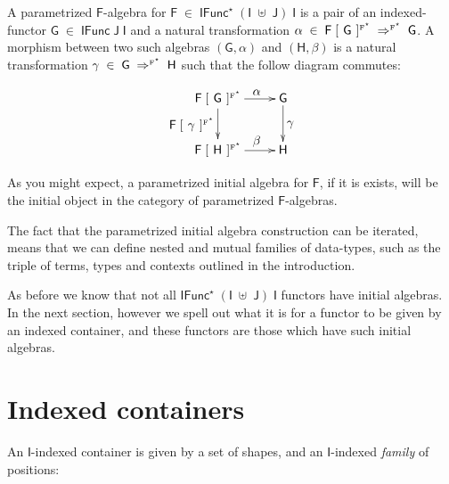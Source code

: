 \documentclass[a4paper]{article}
\newcommand{\Conid}[1]{\mathit{#1}}
\newcommand{\Varid}[1]{\mathit{#1}}
\renewcommand\Varid[1]{\mathord{\textsf{#1}}}
\let\Conid\Varid
\begin{document}
\noindent
A parametrized \ensuremath{\Conid{F}}-algebra for \ensuremath{\Conid{F}\;\in\;\Conid{IFunc}^{\star}\;(\Conid{I}\;\uplus\;\Conid{J})\;\Conid{I}} is a pair of an 
indexed-functor \ensuremath{\Conid{G}\;\in\;\Conid{IFunc}\;\Conid{J}\;\Conid{I}} and a natural transformation
\ensuremath{\alpha\;\in\;\Conid{F}\;[\mskip1.5mu \;\Conid{G}\;\mskip1.5mu]^{\text{\tiny{F}}^{\star}}\;\Rightarrow^{\text{\tiny F}^{\star}}\;\Conid{G}}. A morphism between two such algebras 
\ensuremath{(\Conid{G},\alpha)} and \ensuremath{(\Conid{H},\beta)} is a natural transformation \ensuremath{\gamma\;\in\;\Conid{G}\;\Rightarrow^{\text{\tiny F}^{\star}}\;\Conid{H}} 
such that the follow diagram commutes:

\[
\xymatrix{
\mbox{\ensuremath{\Conid{F}\;[\mskip1.5mu \;\Conid{G}\;\mskip1.5mu]^{\text{\tiny{F}}^{\star}}}}  \ar[r]^{\quad\mbox{\ensuremath{\alpha}}} 
\ar[d]_{\mbox{\ensuremath{\Conid{F}\;[\mskip1.5mu \;\gamma\;\mskip1.5mu]^{\text{\tiny{F}}^{\star}}}}} & \mbox{\ensuremath{\Conid{G}}} \ar[d]^{\mbox{\ensuremath{\gamma}}}\\
\mbox{\ensuremath{\Conid{F}\;[\mskip1.5mu \;\Conid{H}\;\mskip1.5mu]^{\text{\tiny{F}}^{\star}}}} \ar[r]^{\quad\mbox{\ensuremath{\beta}}} & \mbox{\ensuremath{\Conid{H}}}}
\]

\noindent
As you might expect, a parametrized initial algebra for \ensuremath{\Conid{F}}, if it is exists, 
will be the initial object in the category of parametrized \ensuremath{\Conid{F}}-algebras. 

The fact that the parametrized initial algebra construction can be iterated, 
means that we can define nested and mutual families of data-types, such as the
triple of terms, types and contexts outlined in the introduction. 

As before we know that not all \ensuremath{\Conid{IFunc}^{\star}\;(\Conid{I}\;\uplus\;\Conid{J})\;\Conid{I}} functors have initial 
algebras. In the next section, however we spell out what it is for a functor to 
be given by an indexed container, and these functors are those which have such 
initial algebras.



\section{Indexed containers}


An \ensuremath{\Conid{I}}-indexed container is given by a set of shapes, and an \ensuremath{\Conid{I}}-indexed \emph{family} of positions:
\end{document}
